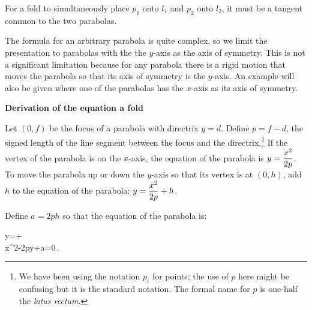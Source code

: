For a fold to simultaneously place $p_1$ onto $l_1$ and $p_2$ onto $l_2$, it must be a tangent common to the two parabolas.

The formula for an arbitrary parabola is quite complex, so we limit the presentation to parabolas with the the $y$-axis as the axis of symmetry. This is not a significant limitation because for any parabola there is a rigid motion that moves the parabola so that its axis of symmetry is the $y$-axis. An example will also be given where one of the parabolas has the $x$-axis as its axis of symmetry.

\newpage

\textbf{Derivation of the equation a fold}

Let $(0,f)$ be the focus of a parabola with directrix $y=d$. Define $p=f-d$, the signed length of the line segment between the focus and the directrix.\footnote{We have been using the notation $p_i$ for points; the use of $p$ here might be confusing but it is the standard notation. The formal name for $p$ is one-half the \emph{latus rectum}.} If the vertex of the parabola is on the $x$-axis, the equation of the parabola is $y=\displaystyle\frac{x^2}{2p}$. To move the parabola up or down the $y$-axis so that its vertex is at $(0,h)$, add $h$ to the equation of the parabola: $y=\displaystyle\frac{x^2}{2p}+h$.
\begin{center}
\end{center}
Define $a=2ph$ so that the equation of the parabola is:
\vspace{-2ex}
\begin{form}{1.2}
y=+\\
x^2-2py+a=0\,.
\end{form}
